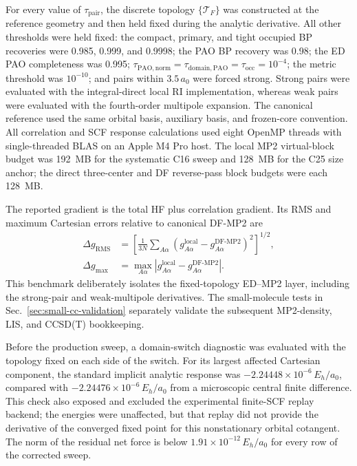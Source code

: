 \documentclass[11pt]{article}
\begin{document}
For every value of $\tau_{\mathrm{pair}}$, the discrete topology
$\{\mathcal T_F\}$ was constructed at the reference geometry and then held
fixed during the analytic derivative.  All other thresholds were held fixed:
the compact, primary, and tight occupied BP recoveries were 0.985, 0.999, and
0.9998; the PAO BP recovery was 0.98; the ED PAO completeness was 0.995;
$\tau_{\mathrm{PAO,norm}}=\tau_{\mathrm{domain,PAO}}=
\tau_{\mathrm{occ}}=10^{-4}$; the metric threshold was $10^{-10}$; and
pairs within $3.5\,a_0$ were forced strong.  Strong pairs were evaluated with
the integral-direct local RI implementation, whereas weak pairs were evaluated
with the fourth-order multipole expansion.  The canonical reference used the
same orbital basis, auxiliary basis, and frozen-core convention.  All
correlation and SCF response calculations used eight OpenMP threads with
single-threaded BLAS on an Apple M4 Pro host.  The local MP2 virtual-block
budget was 192~MB for the systematic C16 sweep and 128~MB for the C25 size
anchor; the direct three-center and DF reverse-pass block budgets were each
128~MB.

The reported gradient is the total HF plus correlation gradient.  Its RMS and
maximum Cartesian errors relative to canonical DF-MP2 are
\begin{align}
 \Delta g_{\mathrm{RMS}}
 &=\left[\frac{1}{3N}\sum_{A\alpha}
 \left(g_{A\alpha}^{\mathrm{local}}-
       g_{A\alpha}^{\mathrm{DF\mbox{-}MP2}\!}\right)^2
 \right]^{1/2},\\
 \Delta g_{\max}
 &=\max_{A\alpha}\left|
 g_{A\alpha}^{\mathrm{local}}-
 g_{A\alpha}^{\mathrm{DF\mbox{-}MP2}\!}\right|.
 \label{eq:gradient-error-measures}
\end{align}
This benchmark deliberately isolates the fixed-topology ED--MP2 layer,
including the strong-pair and weak-multipole derivatives.  The small-molecule
tests in Sec.~\ref{sec:small-cc-validation} separately validate the subsequent
MP2-density, LIS, and CCSD(T) bookkeeping.

Before the production sweep, a domain-switch diagnostic was evaluated with
the topology fixed on each side of the switch.  For its largest affected
Cartesian component, the standard implicit analytic response was
$-2.24448\times10^{-6}\,E_h/a_0$, compared with
$-2.24476\times10^{-6}\,E_h/a_0$ from a microscopic central finite
difference.  This check also exposed and excluded the experimental finite-SCF
replay backend; the energies were unaffected, but that replay did not provide
the derivative of the converged fixed point for this nonstationary orbital
cotangent.  The norm of the residual net force is below
$1.91\times10^{-12}\,E_h/a_0$ for every row of the corrected sweep.
\end{document}
